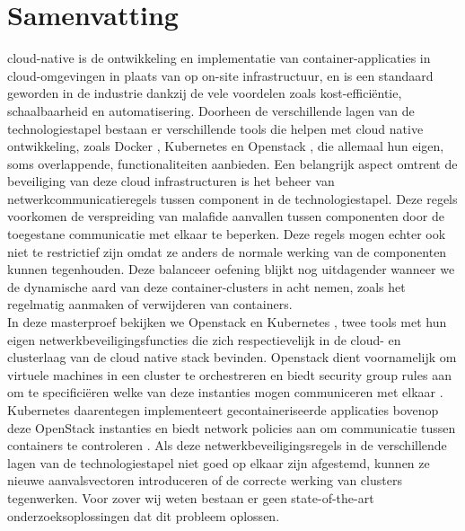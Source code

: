 \chapter{Samenvatting}                                 \label{ch:abstractNL}

cloud-native is de ontwikkeling en implementatie van container-applicaties in cloud-omgevingen in plaats van op on-site infrastructuur, en is een standaard geworden in de industrie dankzij de vele voordelen zoals kost-efficiëntie, schaalbaarheid en automatisering. Doorheen de verschillende lagen van de technologiestapel bestaan er verschillende tools die helpen met cloud native ontwikkeling, zoals  Docker \cite{docker}, Kubernetes \cite{Bernstein2014} en Openstack \cite{Openstack}, die allemaal hun eigen, soms overlappende, functionaliteiten aanbieden. Een belangrijk aspect omtrent de beveiliging van deze cloud infrastructuren is het beheer van netwerkcommunicatieregels tussen component in de technologiestapel. Deze regels voorkomen de verspreiding van malafide aanvallen tussen componenten door de toegestane communicatie met elkaar te beperken. Deze regels mogen echter ook niet te restrictief zijn omdat ze anders de normale werking van de componenten kunnen tegenhouden. Deze balanceer oefening blijkt nog uitdagender wanneer we de dynamische aard van deze container-clusters in acht nemen, zoals het regelmatig aanmaken of verwijderen van containers.
\\[10pt]

In deze masterproef bekijken we Openstack \cite{Openstack} en Kubernetes \cite{Bernstein2014}, twee tools met hun eigen netwerkbeveiligingsfuncties die zich respectievelijk in de cloud- en clusterlaag van de cloud native stack bevinden. Openstack dient voornamelijk om virtuele machines in een cluster te orchestreren en biedt security group rules aan om te specificiëren welke van deze instanties mogen communiceren met elkaar \cite{sgrule}. Kubernetes daarentegen implementeert gecontaineriseerde applicaties bovenop deze OpenStack instanties en biedt network policies aan om communicatie tussen containers te controleren \cite{nps}. Als deze netwerkbeveiligingsregels in de verschillende lagen van de technologiestapel niet goed op elkaar zijn afgestemd, kunnen ze nieuwe aanvalsvectoren introduceren of de correcte werking van clusters tegenwerken. Voor zover wij weten bestaan er geen state-of-the-art onderzoeksoplossingen dat dit probleem oplossen.
\\[10pt]


